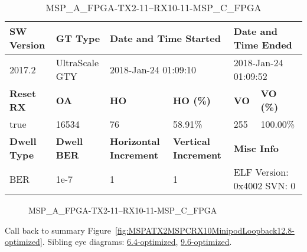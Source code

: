 \begin{table}[h]
\centering
\caption{MSP\_A\_FPGA-TX2-11--RX10-11-MSP\_C\_FPGA}
\label{tab:MSPAFPGATX211RX1011MSPCFPGA12.8-optimized}
\begin{tabular}{@{}|l|l|l|l|l|l|@{}}
\toprule
\textbf{SW Version}                & \textbf{GT Type}   & \multicolumn{2}{l|}{\textbf{Date and Time Started}}            & \multicolumn{2}{l|}{\textbf{Date and Time Ended}}        \\ \midrule
2017.2                       & UltraScale GTY          & \multicolumn{2}{l|}{2018-Jan-24 01:09:10}                   & \multicolumn{2}{l|}{2018-Jan-24 01:09:52}               \\ \midrule
\textbf{Reset RX}                  & \textbf{OA} & \textbf{HO}   & \textbf{HO (\%)} & \textbf{VO} & \textbf{VO (\%)} \\ \midrule
true & 16534        & 76          & 58.91\%        & 255        & 100.00\%       \\ \midrule
\textbf{Dwell Type}                & \textbf{Dwell BER} & \textbf{Horizontal Increment} & \textbf{Vertical Increment}    & \multicolumn{2}{l|}{\textbf{Misc Info}}                  \\ \midrule
BER                            & 1e-7        & 1        & 1           & \multicolumn{2}{l|}{ELF Version: 0x4002 SVN: 0}                         \\ \bottomrule
\end{tabular}
\end{table}

\begin{figure}[h]
\caption{MSP\_A\_FPGA-TX2-11--RX10-11-MSP\_C\_FPGA} \label{fig:MSPAFPGATX211RX1011MSPCFPGA12.8-optimized}
\end{figure}

Call back to summary Figure~\ref{fig:MSPATX2MSPCRX10MinipodLoopback12.8-optimized}.
Sibling eye diagrams: \hyperref[sec:MSPAFPGATX211RX1011MSPCFPGA6.4-optimized]{6.4-optimized}, \hyperref[sec:MSPAFPGATX211RX1011MSPCFPGA9.6-optimized]{9.6-optimized}.

\clearpage
\newpage

